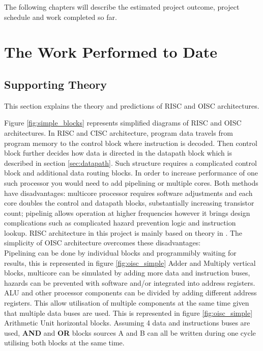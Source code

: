 \documentclass[a4paper,12pt]{article}
\begin{document}
\begin{multicols}{2}
The following chapters will describe the estimated project outcome, project schedule and work completed so far.

\section{The Work Performed to Date}
\subsection{Supporting Theory} \label{sec:theory}
This section explains the theory and predictions of RISC and OISC architectures.

Figure \ref{fig:simple_blocks} represents simplified diagrams of RISC and OISC architectures. In RISC and CISC architecture, program data travels from program memory to the control block where instruction is decoded. Then control block further decides how data is directed in the datapath block which is described in section \ref{sec:datapath}. Such structure requires a complicated control block and additional data routing blocks. In order to increase performance of one such processor you would need to add pipelining or multiple cores. Both methods have disadvantages: multicore processor requires software adjustments and each core doubles the control and datapath blocks, substantially increasing transistor count; pipelinig allows operation at higher frequencies however it brings design complications such as complicated hazard prevention logic and instruction lookup. RISC architecture in this project is mainly based on theory in \autocite{harris_harris_2013}. The simplicity of OISC architecture overcomes these disadvantages:
\\
Pipelining can be done by individual blocks and programmibly waiting for results, this is represented in figure \ref{fig:oisc_simple} Adder and Multiply vertical blocks, multicore can be simulated by adding more data and instruction buses, hazards can be prevented with software and/or integrated into address registers.
\\ 
ALU and other processor components can be divided by adding different address registers. This allow utilisation of multiple components at the same time given that multiple data buses are used. This is represented in figure \ref{fig:oisc_simple} Arithmetic Unit horizontal blocks. Assuming 4 data and instructions buses are used, \textbf{AND} and \textbf{OR} blocks sources A and B can all be written during one cycle utilising both blocks at the same time.
\\

\end{multicols}
\end{document}
